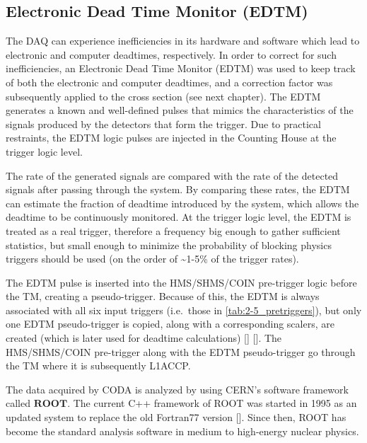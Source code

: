 \documentclass[
]{report}
\begin{document}
\hypertarget{electronic-dead-time-monitor-edtm}{%
\subsection{Electronic Dead Time Monitor
(EDTM)}\label{electronic-dead-time-monitor-edtm}}

The DAQ can experience inefficiencies in its hardware and software which
lead to electronic and computer deadtimes, respectively. In order to
correct for such inefficiencies, an Electronic Dead Time Monitor (EDTM)
was used to keep track of both the electronic and computer deadtimes,
and a correction factor was subsequently applied to the cross section
(see next chapter). The EDTM generates a known and well-defined pulses
that mimics the characteristics of the signals produced by the detectors
that form the trigger. Due to practical restraints, the EDTM logic
pulses are injected in the Counting House at the trigger logic level.

The rate of the generated signals are compared with the rate of the
detected signals after passing through the system. By comparing these
rates, the EDTM can estimate the fraction of deadtime introduced by the
system, which allows the deadtime to be continuously monitored. At the
trigger logic level, the EDTM is treated as a real trigger, therefore a
frequency big enough to gather sufficient statistics, but small enough
to minimize the probability of blocking physics triggers should be used
(on the order of \textasciitilde1-5\% of the trigger rates).

The EDTM pulse is inserted into the HMS/SHMS/COIN pre-trigger logic
before the TM, creating a pseudo-trigger. Because of this, the EDTM is
always associated with all six input triggers (i.e.~those in
\ref{tab:2-5_pretriggers}), but only one EDTM pseudo-trigger is copied,
along with a corresponding scalers, are created (which is later used for
deadtime calculations) {[}\cite{murphy_private_2022}{]}
{[}\cite{murphy_graphical_2022}{]}. The HMS/SHMS/COIN pre-trigger along
with the EDTM pseudo-trigger go through the TM where it is subsequently
L1ACCP.

\label{Chapter-3}

The data acquired by CODA is analyzed by using CERN's software framework
called \(\textbf{ROOT}\). The current C++ framework of ROOT was started
in 1995 as an updated system to replace the old Fortran77 version
{[}\cite{brun_history_2011}{]}. Since then, ROOT has become the standard
analysis software in medium to high-energy nuclear physics.
\end{document}
